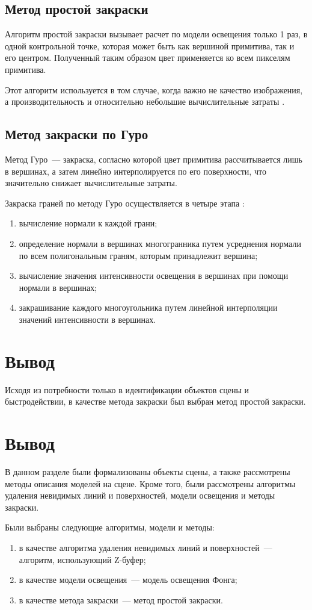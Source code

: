 \subsection{Метод простой закраски}

Алгоритм простой закраски вызывает расчет по модели освещения только 1 раз, в одной контрольной точке, которая может быть как вершиной примитива, так и его центром.
Полученный таким образом цвет применяется ко всем пикселям примитива.

Этот алгоритм используется в том случае, когда важно не качество изображения, а производительность и относительно небольшие вычислительные затраты \cite{baseLight}.

\clearpage

\subsection{Метод закраски по Гуро}

Метод Гуро~--- закраска, согласно которой цвет примитива рассчитывается лишь в вершинах, а затем линейно интерполируется по его поверхности, что значительно снижает вычислительные затраты.

Закраска граней по методу Гуро осуществляется в четыре этапа \cite{draw1}:
\begin{enumerate}
	\item вычисление нормали к каждой грани;
	\item определение нормали в вершинах многогранника путем усреднения нормали по всем полигональным граням, которым принадлежит вершина;
	\item вычисление значения интенсивности освещения в вершинах при помощи нормали в вершинах;
	\item закрашивание каждого многоугольника путем линейной интерполяции значений интенсивности в вершинах.
\end{enumerate}

\section*{Вывод}

Исходя из потребности только в идентификации объектов сцены и быстродействии, в качестве метода закраски был выбран метод простой закраски.

\section{Вывод}

В данном разделе были формализованы объекты сцены, а также рассмотрены методы описания моделей на сцене.
Кроме того, были рассмотрены алгоритмы удаления невидимых линий и поверхностей, модели освещения и методы закраски.

Были выбраны следующие алгоритмы, модели и методы:
\begin{enumerate}
	\item в качестве алгоритма удаления невидимых линий и поверхностей~--- алгоритм, использующий Z-буфер;
	\item в качестве модели освещения~--- модель освещения Фонга;
	\item в качестве метода закраски~--- метод простой закраски.
\end{enumerate}